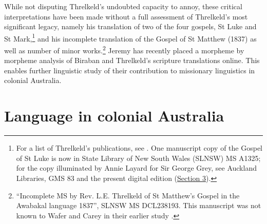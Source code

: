 While not disputing Threlkeld’s undoubted capacity to annoy, these critical interpretations have been made without a full assessment of Threlkeld’s most significant legacy, namely his translation of two of the four gospels, \pagebreak{}St Luke and St Mark,\footnote{For a list of Threlkeld’s publications, see \citet[374--376]{gunson_australian_1974b}. One manuscript copy of the Gospel of St Luke is now in State Library of New South Wales (SLNSW) MS A1325; for the copy illuminated by Annie Layard for Sir George Grey, see Auckland Libraries, GMS 83 \citep{carey_secret_2011} and the present digital edition (\hyperref[sec:Section_3]{Section 3}).} and his incomplete translation of the Gospel of St Matthew (1837) as well as number of minor works.\footnote{“Incomplete MS by Rev. L.E. Threlkeld of St Matthew’s Gospel in the Awabakal language 1837”, SLNSW MS DCL238193. This manuscript was not known to Wafer and Carey in their earlier study \citep[124, n. 16]{wafer_waiting_2011}.} Jeremy \citet{steele_awabakal_2024} has recently placed a morpheme by morpheme analysis of Biraban and Threlkeld’s scripture translations online. This enables further linguistic study of their contribution to missionary linguistics in colonial Australia.

\section{Language in colonial Australia}

